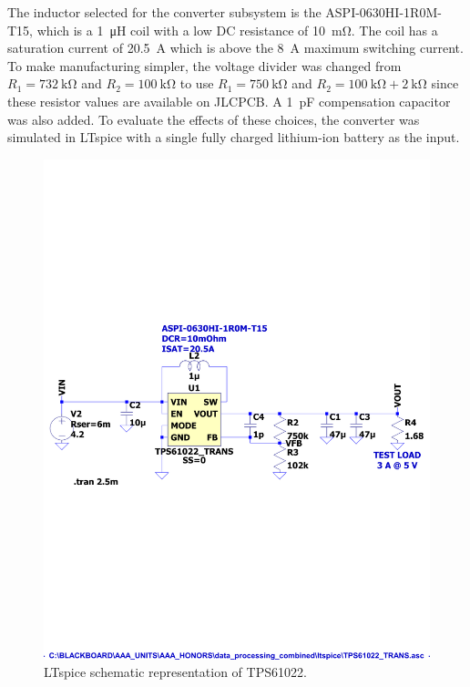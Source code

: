 \documentclass[draft]{report}
\begin{document}
The inductor selected for the converter subsystem is the ASPI-0630HI-1R0M-T15, which is a \SI{1}{\micro\henry} coil with a low DC resistance of \SI{10}{\milli\ohm}. The coil has a saturation current of \SI{20.5}{\ampere} which is above the \SI{8}{\ampere} maximum switching current. To make manufacturing simpler, the voltage divider was changed from $R_1=\SI{732}{\kilo\ohm}$ and $R_2=\SI{100}{\kilo\ohm}$ to use $R_1=\SI{750}{\kilo\ohm}$ and $R_2=\SI{100}{\kilo\ohm}+\SI{2}{\kilo\ohm}$ since these resistor values are available on JLCPCB.  A \SI{1}{\pico\farad} compensation capacitor was also added. To evaluate the effects of these choices, the converter was simulated in LTspice with a single fully charged lithium-ion battery as the input.

\begin{figure}[H]
  \centering
  \includegraphics[trim=0 8.5cm 0 8cm, clip, width=\linewidth]{images/TPS61022-simulation.pdf}
  \caption{LTspice schematic representation of TPS61022.}
  \label{fig:TPS61022-schematic-ltspice}
\end{figure}
\end{document}
